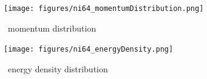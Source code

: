 \begin{figure}[H]
    \centering
    \texttt{[image: figures/ni64\_momentumDistribution.png]}
    \caption{\niFour\ momentum distribution}
    \label{DOMFitData_ni64_momentumDistribution}
\end{figure}

\begin{figure}[H]
    \centering
    \texttt{[image: figures/ni64\_energyDensity.png]}
    \caption{\niFour\ energy density distribution}
    \label{DOMFitData_ni64_energyDensity}
\end{figure}

%
%
%
%
